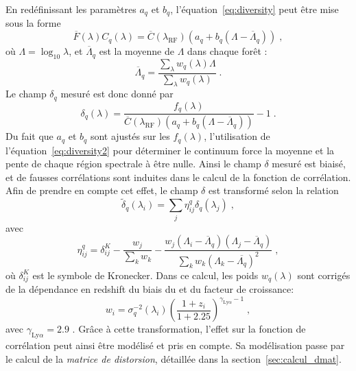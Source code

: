 En redéfinissant les paramètres $a_q$ et $b_q$, l'équation~\ref{eq:diversity} peut être mise sous la forme
\begin{equation}
  \label{eq:diversity2}
  \overline F(\lambda) C_q(\lambda) = \overline C(\lambda_{\mathrm{RF}})(a_q + b_q (\Lambda - \overline \Lambda_q))  \; ,
\end{equation}
où $\Lambda = \log_{10} \lambda$, et $\overline \Lambda_q$ est la moyenne de $\Lambda$ dans chaque forêt :
\begin{equation}
  \label{eq:lambda_mean}
  \overline \Lambda_q = \frac{\sum\limits_{\lambda} w_q(\lambda) \Lambda}{\sum\limits_{\lambda} w_q(\lambda)}  \; .
\end{equation}
Le champ $ \delta_q$ mesuré est donc donné par
\begin{equation}
  \label{eq:deltaF2}
   \delta_q(\lambda) = \frac{f_q(\lambda)}{\overline C(\lambda_{\mathrm{RF}})(a_q + b_q (\Lambda - \overline \Lambda_q))} - 1  \; .
\end{equation}
Du fait que $a_q$ et $b_q$ sont ajustés sur les $f_q(\lambda)$, l'utilisation de l'équation~\ref{eq:diversity2} pour déterminer le continuum force la moyenne et la pente de chaque région spectrale à être nulle. Ainsi le champ $\delta$ mesuré est biaisé, et de fausses corrélations sont induites dans le calcul de la fonction de corrélation.
Afin de prendre en compte cet effet, le champ $\delta$ est transformé selon la relation
\begin{equation}
  \label{eq:deltaF3}
  \tilde \delta_q(\lambda_i) = \sum\limits_j \eta_{ij}^q \delta_q(\lambda_j)  \; ,
\end{equation}
avec
\begin{equation}
  \eta^q_{ij}
  =
  \delta^K_{ij}
  - \frac{
    w_{j}
  }{
    \sum\limits_{k} w_{k}
  }
  -
  \frac{
    w_{j} \left( \Lambda_{i}-\overline \Lambda_{q} \right) \left(\Lambda_j-\overline \Lambda_{q} \right)
  }{
    \sum\limits_{k} w_{k} \left( \Lambda_{k}-\overline {\Lambda_{q}} \right)^{2}
  }
  \; ,
  \label{eq:proj1}
\end{equation}
où $\delta^K_{ij}$ est le symbole de Kronecker.
Dans ce calcul, les poids $w_q(\lambda)$ sont corrigés de la dépendance en redshift du biais du \lya{} et du facteur de croissance:
\begin{equation}
  \label{eq:weights2}
  w_{i}
  =
  \sigma_q^{-2}(\lambda_i)
  \left( \frac{1+z_{i}}{1+2.25} \right)^{\gamma_{\mathrm{Ly}\alpha} -1} \;,
\end{equation}
avec $\gamma_{\mathrm{Ly}\alpha} = 2.9$ \autocite{McDonald2004}.
Grâce à cette transformation, l'effet sur la fonction de corrélation peut ainsi être modélisé et pris en compte. Sa modélisation passe par le calcul de la \emph{matrice de distorsion}, détaillée dans la section~\ref{sec:calcul_dmat}.

